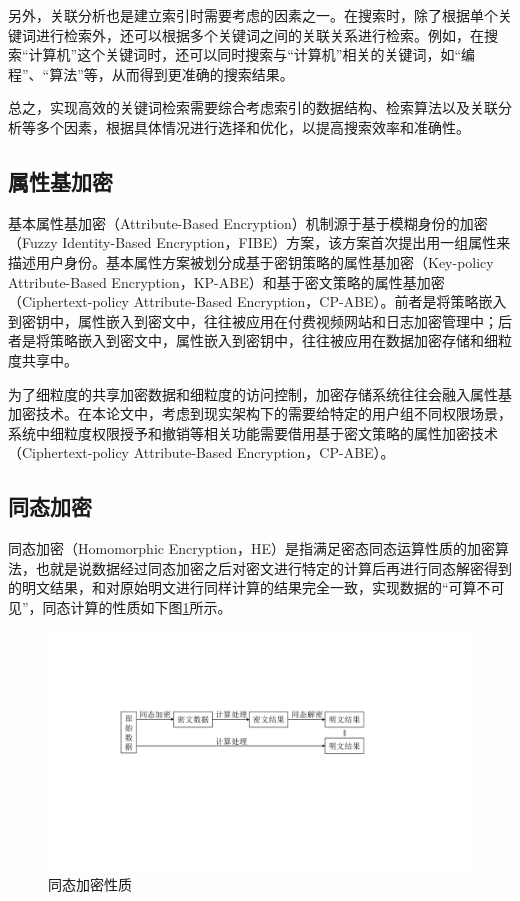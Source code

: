 \documentclass[promaster]{thesis-uestc}
\begin{document}
另外，关联分析也是建立索引时需要考虑的因素之一。在搜索时，除了根据单个关键词进行检索外，还可以根据多个关键词之间的关联关系进行检索。例如，在搜索“计算机”这个关键词时，还可以同时搜索与“计算机”相关的关键词，如“编程”、“算法”等，从而得到更准确的搜索结果。

总之，实现高效的关键词检索需要综合考虑索引的数据结构、检索算法以及关联分析等多个因素，根据具体情况进行选择和优化，以提高搜索效率和准确性。

\subsection{属性基加密}\label{属性基加密}

基本属性基加密（Attribute-Based Encryption）机制源于基于模糊身份的加密（Fuzzy Identity-Based Encryption，FIBE）方案，该方案首次提出用一组属性来描述用户身份。基本属性方案被划分成基于密钥策略的属性基加密（Key-policy Attribute-Based Encryption，KP-ABE）和基于密文策略的属性基加密（Ciphertext-policy Attribute-Based Encryption，CP-ABE）。前者是将策略嵌入到密钥中，属性嵌入到密文中，往往被应用在付费视频网站和日志加密管理中；后者是将策略嵌入到密文中，属性嵌入到密钥中，往往被应用在数据加密存储和细粒度共享中。

为了细粒度的共享加密数据和细粒度的访问控制，加密存储系统往往会融入属性基加密技术。在本论文中，考虑到现实架构下的需要给特定的用户组不同权限场景，系统中细粒度权限授予和撤销等相关功能需要借用基于密文策略的属性加密技术（Ciphertext-policy Attribute-Based Encryption，CP-ABE）。

\subsection{同态加密}\label{同态加密}

同态加密（Homomorphic Encryption，HE）是指满足密态同态运算性质的加密算法，也就是说数据经过同态加密之后对密文进行特定的计算后再进行同态解密得到的明文结果，和对原始明文进行同样计算的结果完全一致，实现数据的“可算不可见”，同态计算的性质如下图\ref{同态加密性质}所示。
\begin{figure}[htbp]
    \centering
    \includegraphics[width = 0.8\linewidth]{pic/同态加密性质.pdf}
    \caption{同态加密性质}
    \label{同态加密性质}
\end{figure}
\end{document}
